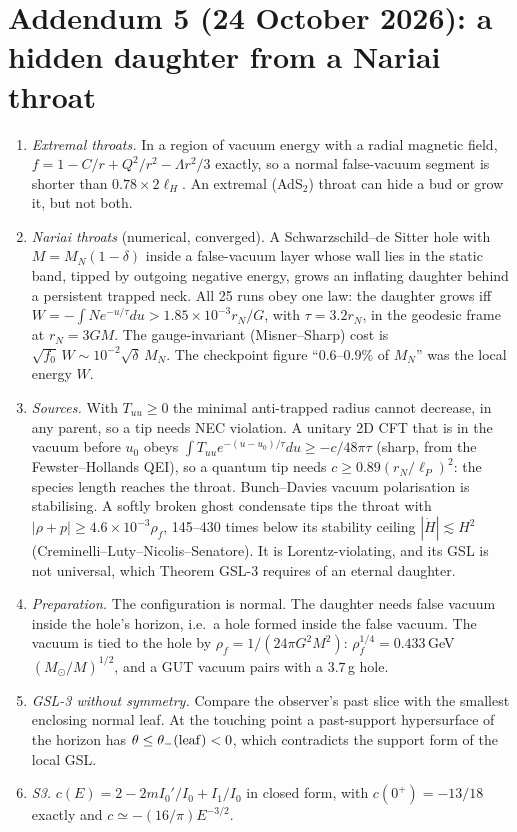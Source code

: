 \documentclass[11pt,a4paper]{article}
\theoremstyle{remark}\newtheorem{remark}[theorem]{Remark}
\begin{document}
\section*{Addendum 5 (24 October 2026): a hidden daughter from a Nariai throat}
\begin{enumerate}
\item \emph{Extremal throats.} In a region of vacuum energy with a radial magnetic field, $f=1-C/r+Q^2/r^2-\Lambda r^2/3$ exactly, so a normal false-vacuum segment
is shorter than $0.78\times2\ell_H$. An extremal (AdS$_2$) throat can hide a bud or grow it, but not both.
\item \emph{Nariai throats} (numerical, converged). A Schwarzschild--de Sitter hole with $M=M_N(1-\delta)$ inside a false-vacuum layer whose wall lies in the static
band, tipped by outgoing negative energy, grows an inflating daughter behind a persistent trapped neck. All 25 runs obey one law: the daughter grows iff
$W=-\int N e^{-u/\tau}du>1.85\times10^{-3}r_N/G$, with $\tau=3.2r_N$, in the geodesic frame at $r_N=3GM$. The gauge-invariant (Misner--Sharp) cost is
$\sqrt{f_0}\,W\sim10^{-2}\sqrt\delta\,M_N$. The checkpoint figure ``$0.6$--$0.9\%$ of $M_N$'' was the local energy $W$.
\item \emph{Sources.} With $T_{uu}\ge0$ the minimal anti-trapped radius cannot decrease, in any parent, so a tip needs NEC violation. A unitary 2D CFT that is in the
vacuum before $u_0$ obeys $\int T_{uu}e^{-(u-u_0)/\tau}du\ge-c/48\pi\tau$ (sharp, from the Fewster--Hollands QEI), so a quantum tip needs
$c\ge0.89(r_N/\ell_P)^2$: the species length reaches the throat. Bunch--Davies vacuum polarisation is stabilising. A softly broken ghost condensate tips the
throat with $|\rho+p|\ge4.6\times10^{-3}\rho_f$, 145--430 times below its stability ceiling $|\dot H|\lesssim H^2$ (Creminelli--Luty--Nicolis--Senatore). It is
Lorentz-violating, and its GSL is not universal, which Theorem GSL-3 requires of an eternal daughter.
\item \emph{Preparation.} The configuration is normal. The daughter needs false vacuum inside the hole's horizon, i.e.\ a hole formed inside the false vacuum. The
vacuum is tied to the hole by $\rho_f=1/(24\pi G^2M^2)$: $\rho_f^{1/4}=0.433$\,GeV\,$(M_\odot/M)^{1/2}$, and a GUT vacuum pairs with a $3.7$\,g hole.
\item \emph{GSL-3 without symmetry.} Compare the observer's past slice with the smallest enclosing normal leaf. At the touching point a past-support hypersurface
of the horizon has $\theta\le\theta_-({\rm leaf})<0$, which contradicts the support form of the local GSL.
\item \emph{S3.} $c(E)=2-2mI_0'/I_0+I_1/I_0$ in closed form, with $c(0^+)=-13/18$ exactly and $c\simeq-(16/\pi)E^{-3/2}$.
\end{enumerate}
\end{document}
